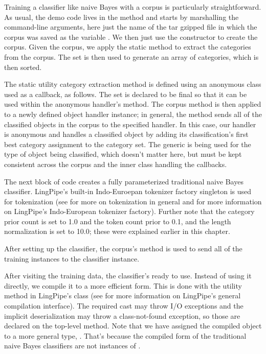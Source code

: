 Training a classifier like naive Bayes with a corpus is particularly
straightforward.  As usual, the demo code lives in the 
method and starts by marshalling the command-line arguments, here just
the name of the tar gzipped file in which the corpus was saved as
the  variable .  We
then just use the constructor to create the corpus. 
%
%
Given the corpus, we apply the static method  to
extract the categories from the corpus.  The set is then used to generate
an array of categories, which is then sorted.

The static utility category extraction method is defined using an
anonymous class used as a callback, as follows.
%
%
The set is declared to be final so that it can be used within the
anonymous handler's method.  The corpus method  is
then applied to a newly defined object handler instance; in general,
the  method sends all of the classified objects in
the corpus to the specified handler.  In this case, our handler is
anonymous and handles a classified object by adding its
classification's first best category assignment to the category set.
The generic  is being used for the type of object being
classified, which doesn't matter here, but must be kept consistent
across the corpus and the inner class handling the callbacks.

The next block of code creates a fully parameterized traditional
naive Bayes classifier.
%
%
LingPipe's built-in Indo-Euroepan tokenizer factory singleton is used
for tokenization (see  for more on tokenization
in general and  for more information on
LingPipe's Indo-European tokenizer factory).  Further note that the
category prior count is set to 1.0 and the token count prior to 0.1,
and the length normalization is set to 10.0; these were explained
earlier in this chapter.

After setting up the classifier, the corpus's 
method is used to send all of the training instances to the
classifier instance.  

After visiting the training data, the classifier's ready to use.
Instead of using it directly, we compile it to a more efficient form.
This is done with the utility method  in LingPipe's
 class (see  for
more information on LingPipe's general compilation interface).  The
required cast may throw I/O exceptions and the implicit
deserialization may throw a class-not-found exception, so those are
declared on the top-level  method.  Note that we have
assigned the compiled object to a more general type,
.  That's because the compiled form of the
traditional naive Bayes classifiers are not instances of
.

